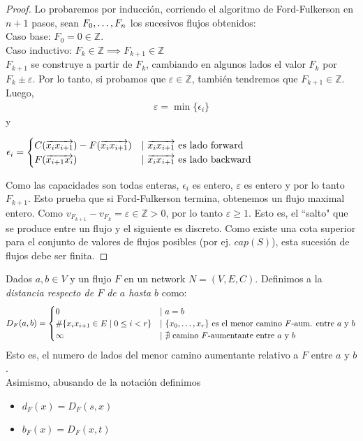 \begin{proof}
  Lo probaremos por inducción, corriendo el algoritmo de Ford-Fulkerson en $n+1$ pasos, sean $F_0, \mathellipsis, F_n$ los sucesivos flujos obtenidos:\\
  Caso base: $F_0 = 0 \in \mathbb{Z}$.\\
  Caso inductivo:
  $F_k \in \mathbb{Z} \implies F_{k+1} \in \mathbb{Z}$\\
  $F_{k+1}$ se construye a partir de $F_k$, cambiando en algunos lados el valor $F_k$ por $F_k \pm \varepsilon$. Por lo tanto, si probamos que $\varepsilon \in \mathbb{Z}$, también tendremos que $F_{k+1} \in \mathbb{Z}$. Luego,
  \begin{align}
    \varepsilon = \min\{\epsilon_i\}
  \end{align}
  y \begin{center}
    $\epsilon_i = \begin{cases} 
        C(\overrightarrow{x_i x_{i+1}}) - F(\overrightarrow{x_i x_{i+1}}) & |\ \overrightarrow{x_i x_{i+1}} \text{ es lado forward}\\
        F(\overrightarrow{x_{i+1} x_i}) & |\ \overrightarrow{x_i x_{i+1}} \text{ es lado backward}
    \end{cases}$
  \end{center}
  Como las capacidades son todas enteras, $\epsilon_i$ es entero, $\varepsilon$  es entero y por lo tanto $F_{k+1}$.
  Esto prueba que si Ford-Fulkerson termina, obtenemos un flujo maximal entero.
  Como $v_{F_{k+1}} - v_{F_k} = \varepsilon \in \mathbb{Z} > 0$, por lo tanto $\varepsilon \ge 1$. Esto es, el ``salto" que se produce entre un flujo y el siguiente es discreto.
  Como existe una cota superior para el conjunto de valores de flujos posibles (por ej. $cap(S)$), esta sucesión de flujos debe ser finita. 
\end{proof}

\begin{definition}
  Dados $a,b\in V$ y un flujo $F$ en un network $N = (V,E,C)$. Definimos a la 
  \emph{distancia respecto de $F$ de $a$ hasta $b$} como:
  \begin{align}
    D_F(a,b) = 
    \begin{cases}
      0 & |\ a = b\\
      \#\{x_i x_{i+1} \in E\mid 0\le i < r \}  & |\ \{x_0, \mathellipsis, x_r\} \text{ es el menor camino $F$-aum. entre $a$ y $b$} \\ 
      \infty & |\ \nexists~ \text{camino $F$-aumentante entre $a$ y $b$}
    \end{cases}
  \end{align}
  Esto es, el numero de lados del menor camino aumentante relativo a $F$ entre $a$ y $b$.\\
  Asimismo, abusando de la notación definimos
  \begin{itemize}
  \item $d_F(x) = D_F(s,x)$
  \item $b_F(x) = D_F(x,t)$
  \end{itemize}
\end{definition}

